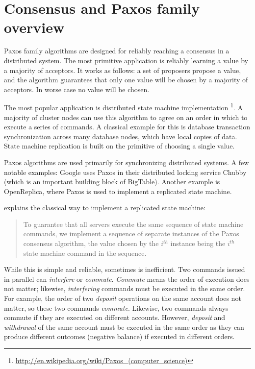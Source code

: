 \documentclass[english,11pt]{l4proj}
\begin{document}
\section{Consensus and Paxos family overview}
\label{sec:paxos-family}

Paxos family algorithms are designed for reliably reaching a consensus in a
distributed system. The most primitive application is reliably learning a value
by a majority of acceptors. It works as follows: a set of proposers propose a
value, and the algorithm guarantees that only one value will be chosen by a
majority of acceptors. In worse case no value will be chosen.

The most popular application is distributed state machine implementation
\footnote{\url{http://en.wikipedia.org/wiki/Paxos\_(computer\_science)}}. A
majority of cluster nodes can use this algorithm to agree on an order in which
to execute a series of commands. A classical example for this is database
transaction synchronization across many database nodes, which have local copies
of data. State machine replication is built on the primitive of choosing a
single value.

Paxos algorithms are used primarily for synchronizing distributed systems. A few
notable examples: Google uses Paxos in their distributed locking service
Chubby\cite{chubby} (which is an important building block of BigTable). Another
example is OpenReplica\cite{openreplica}, where Paxos is used to implement a
replicated state machine.

\cite{paxos-simple} explains the classical way to implement a replicated state
machine:

\begin{quote}
To guarantee that all servers execute the same sequence of state machine
commands, we implement a sequence of separate instances of the Paxos consensus
algorithm, the value chosen by the $i^{th}$ instance being the $i^{th}$ state
machine command in the sequence.
\end{quote}

While this is simple and reliable, sometimes is inefficient. Two commands issued
in parallel can \emph{interfere} or \emph{commute}. \emph{Commute} means the
order of execution does not matter; likewise, \emph{interfering} commands must
be executed in the same order. For example, the order of two \emph{deposit}
operations on the same account does not matter, so these two commands
\emph{commute}. Likewise, two commands always commute if they are executed on
different accounts. However, \emph{deposit} and \emph{withdrawal} of the same
account must be executed in the same order as they can produce different
outcomes (negative balance) if executed in different orders.
\end{document}
